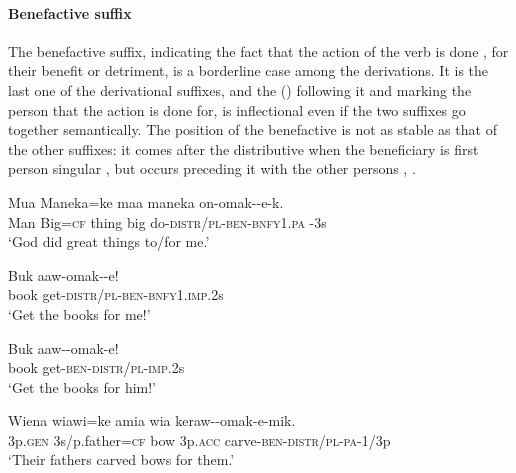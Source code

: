 \paragraph{Benefactive suffix} \label{sec:3.8.2.3.3}
{}
The benefactive suffix, indicating the fact that the action of the verb is done , for their benefit or detriment, is a borderline case among the derivations. It is the last one of the derivational suffixes, and the  () following it and marking the person that the action is done for, is inflectional even if the two suffixes go together semantically. The position of the benefactive is not as stable as that of the other suffixes: it comes after the distributive when the beneficiary is first person singular ,  but occurs preceding it with the other persons , . 

\ea%
\label{ex:3:x210}
\gll Mua Maneka=ke maa maneka on-omak--e-k. \\
Man Big=\textsc{cf} thing big do-\textsc{distr}/\textsc{pl}-\textsc{ben}-\textsc{bnfy}1.\textsc{pa}{\footnotemark} -3s \\
\glt`God did great things to/for me.'
\z
{}

\ea%
\label{ex:3:x1925}
\gll Buk aaw-omak--e! \\
book get-\textsc{distr}/\textsc{pl}-\textsc{ben}-\textsc{bnfy}1.\textsc{imp}.2s\\
\glt`Get the books for me!'
\z

\ea%
\label{ex:3:x211}
\gll Buk aaw--omak-e! \\
book get-\textsc{ben}-\textsc{distr}/\textsc{pl}-\textsc{imp}.2s \\
\glt`Get the books for him!'
\z

\ea%
\label{ex:3:x1926}
\gll Wiena wiawi=ke amia wia keraw--omak-e-mik. \\
3p.\textsc{gen} 3s/p.father=\textsc{cf} bow 3p.\textsc{acc} carve-\textsc{ben}-\textsc{distr}/\textsc{pl}-\textsc{pa}-1/3p \\
\glt`Their fathers carved bows for them.'
\z

